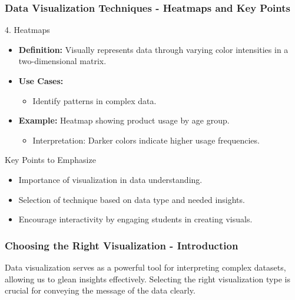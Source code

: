 \documentclass[aspectratio=169]{beamer}
\begin{document}
\begin{frame}[fragile]
    \frametitle{Data Visualization Techniques - Heatmaps and Key Points}
    \begin{block}{4. Heatmaps}
        \begin{itemize}
            \item \textbf{Definition:} Visually represents data through varying color intensities in a two-dimensional matrix.
            \item \textbf{Use Cases:}
                \begin{itemize}
                    \item Identify patterns in complex data.
                \end{itemize}
            \item \textbf{Example:} Heatmap showing product usage by age group.
                \begin{itemize}
                    \item Interpretation: Darker colors indicate higher usage frequencies.
                \end{itemize}
        \end{itemize}
    \end{block}
    \begin{block}{Key Points to Emphasize}
        \begin{itemize}
            \item Importance of visualization in data understanding.
            \item Selection of technique based on data type and needed insights.
            \item Encourage interactivity by engaging students in creating visuals.
        \end{itemize}
    \end{block}
\end{frame}

\begin{frame}[fragile]
    \frametitle{Choosing the Right Visualization - Introduction}
    Data visualization serves as a powerful tool for interpreting complex datasets, allowing us to glean insights effectively. 
    Selecting the right visualization type is crucial for conveying the message of the data clearly.
\end{frame}
\end{document}
